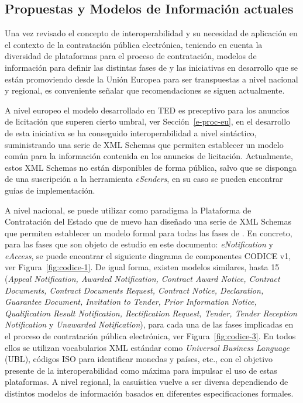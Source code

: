 \subsection{Propuestas y Modelos de Información actuales}\label{data-model-eproc}
Una vez revisado el concepto de interoperabilidad y su necesidad de aplicación
en el contexto de la contratación pública electrónica, teniendo en cuenta
la diversidad de plataformas para el proceso de contratación, modelos de información para definir las distintas
fases de \eproc y las iniciativas en desarrollo que se están promoviendo desde la Unión
Europea para ser transpuestas a nivel nacional y regional, es conveniente señalar que recomendaciones
se siguen actualmente.

A nivel europeo el modelo desarrollado en TED es preceptivo para los anuncios de licitación
que superen cierto umbral, ver Sección~\ref{e-proc-eu}, en el desarrollo de esta iniciativa
se ha conseguido interoperabilidad a nivel sintáctico, suministrando una serie de \gls{XML Schema}s que 
permiten establecer un modelo común para la información contenida en los anuncios de licitación. Actualmente,
estos \gls{XML Schema}s no están disponibles de forma pública, salvo que se disponga de una suscripción a la herramienta
\textit{eSenders}, en su caso se pueden encontrar guías de implementación. 

A nivel nacional, se puede utilizar como paradigma la Plataforma de Contratación del Estado 
que de nuevo han diseñado una serie de XML Schemas que permiten establecer un modelo formal
para todas las fases de \eproc. En concreto, para las fases que son objeto
de estudio en este documento: \textit{eNotification} y \textit{eAccess}, se puede encontrar el siguiente diagrama de componentes \gls{CODICE} v1, ver Figura~\ref{fig:codice-1}. De igual
forma, existen modelos similares, hasta 15 (\textit{Appeal Notification, Awarded Notification, Contract Award Notice, Contract Documents, Contract Documents Request,
 Contract Notice, Declaration, Guarantee Document, Invitation to Tender, Prior Information Notice, Qualification Result Notification, 
Rectification Request, Tender, Tender Reception Notification} y \textit{Unawarded Notification}), para cada una de las fases implicadas en 
el proceso de contratación pública electrónica, ver Figura~\ref{fig:codice-3}. En todos ellos se utilizan 
vocabularios \gls{XML} estándar como \textit{Universal Business Language} (\gls{UBL}), códigos \gls{ISO} para identificar monedas y países, etc., 
con el objetivo presente de la interoperabilidad como máxima para impulsar el uso de estas
plataformas.  A nivel regional, la casuística vuelve a ser diversa dependiendo de distintos 
modelos de información basados en diferentes especificaciones formales.


